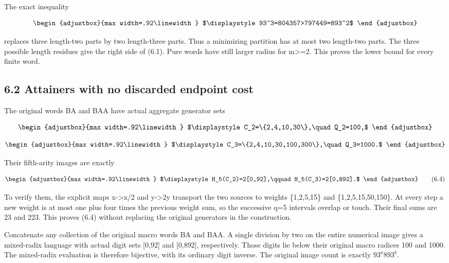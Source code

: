 The exact inequality

\[
\begin{adjustbox}{max width=.92\linewidth}
$\displaystyle 93^3=804357>797449=893^2$
\end{adjustbox}
\]

replaces three length-two parts by two length-three parts. Thus a minimizing partition has at most two length-two parts. The three possible length residues give the right side of (6.1). Pure words have still larger radius for m\textgreater=2. This proves the lower bound for every finite word.

\subsection{6.2 Attainers with no discarded endpoint cost}\label{n28-attainers-with-no-discarded-endpoint-cost}

The original words BA and BAA have actual aggregate generator sets

\[
\begin{adjustbox}{max width=.92\linewidth}
$\displaystyle C_2=\{2,4,10,30\},\quad Q_2=100,$
\end{adjustbox}
\]

\[
\begin{adjustbox}{max width=.92\linewidth}
$\displaystyle C_3=\{2,4,10,30,100,300\},\quad Q_3=1000.$
\end{adjustbox}
\]

Their fifth-arity images are exactly

\[
\begin{adjustbox}{max width=.92\linewidth}
$\displaystyle H_5(C_2)=2[0,92],\qquad H_5(C_3)=2[0,892].$
\end{adjustbox}
\tag{6.4}
\]

To verify them, the explicit maps x-\textgreater x/2 and y-\textgreater2y transport the two sources to weights \{1,2,5,15\} and \{1,2,5,15,50,150\}. At every step a new weight is at most one plus four times the previous weight sum, so the successive q=5 intervals overlap or touch. Their final sums are 23 and 223. This proves (6.4) without replacing the original generators in the construction.

Concatenate any collection of the original macro words BA and BAA. A single division by two on the entire numerical image gives a mixed-radix language with actual digit sets {[}0,92{]} and {[}0,892{]}, respectively. Those digits lie below their original macro radices 100 and 1000. The mixed-radix evaluation is therefore bijective, with its ordinary digit inverse. The original image count is exactly \(93^a893^b\).

